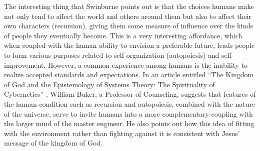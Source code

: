 The
interesting thing that Swinburne points out is that the choices humans
make not only tend to affect the world and others around them but also to
affect their own characters (recursion), giving them some measure of
influence over the kinds of people they eventually become. This is a
very interesting affordance, which when coupled with the human ability
to envision a preferable future, leads people to form various purposes
related to self-organization (autopoiesis) and self-improvement.
However, a common experience among humans is the inability to realize
accepted standards and expectations. In an article entitled “The
Kingdom of God and the Epistemology of Systems Theory: The Spirituality
of Cybernetics” \citep{buker2009}, William Buker, a Professor of
Counseling, suggests that features of the human condition such as
recursion and autopoiesis, combined with the nature of the universe,
serve to invite humans into a more complementary coupling with the
larger mind of the master engineer. He also points out how this idea of
fitting with the environment rather than fighting against it is
consistent with Jesus’ message of the kingdom of God.

